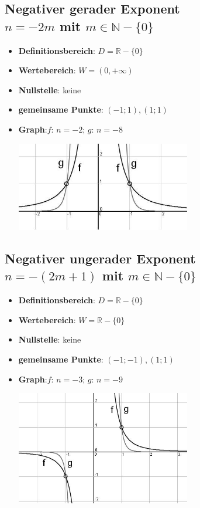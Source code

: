 \subsection*{Negativer gerader Exponent\\ $n = -2m$ mit $ m \in \mathbb{N}-\{0\}$}
\begin{itemize}
	\item \textbf{Definitionsbereich}: $ D = \mathbb{R}-\{0\} $
	\item \textbf{Wertebereich}: $ W = (0, + \infty) $
	\item \textbf{Nullstelle}: keine
	\item \textbf{gemeinsame Punkte}: $(-1;1), (1;1) $
	\item \textbf{Graph}:$f$: $n = -2$; $g$: $n=-8$ \\
\begin{center}
		\includegraphics[width=0.60\textwidth]{img/P3.jpg}
\end{center}
\end{itemize}

\subsection*{Negativer ungerader Exponent\\ $n = -(2m+1)$ mit $ m \in \mathbb{N}-\{0\}$}
\begin{itemize}
	\item \textbf{Definitionsbereich}: $ D = \mathbb{R}-\{0\} $
	\item \textbf{Wertebereich}: $ W = \mathbb{R}-\{0\} $
	\item \textbf{Nullstelle}: keine
	\item \textbf{gemeinsame Punkte}: $(-1;-1), (1;1) $
	\item \textbf{Graph}:$f$: $n = -3$; $g$: $n=-9$ \\
\begin{center}
		\includegraphics[width=0.60\textwidth]{img/P4.jpg}
\end{center}
\end{itemize}

